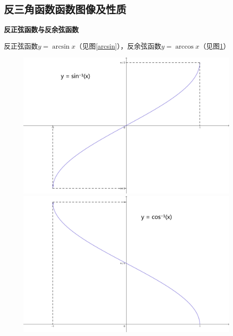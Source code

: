 \subsection{反三角函数函数图像及性质}
\textbf{反正弦函数与反余弦函数}

反正弦函数$y=\arcsin x$（见图\ref{arcsin}），反余弦函数$y=\arccos x$（见图\ref{arccos}）
\begin{figure}[H]
\centering
\begin{minipage}{0.4\linewidth}
    \centerline{\includegraphics[width=\textwidth]{figure/arcsin_plot.png}}
    \caption{} \label{arcsin}
\end{minipage}
    \qquad
\begin{minipage}{0.4\linewidth}
    \centerline{\includegraphics[width=\textwidth]{figure/arccos_plot.png}}
    \caption{} \label{arccos}
\end{minipage}
\end{figure}

